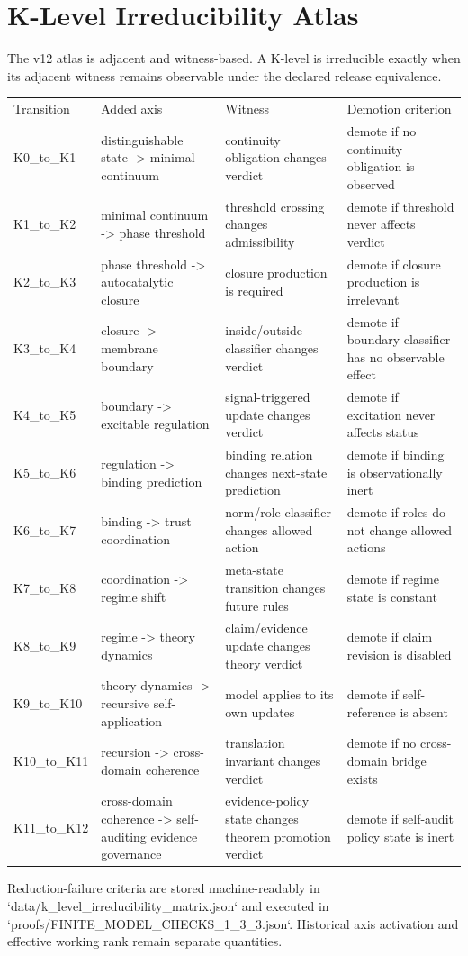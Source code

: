 \section{K-Level Irreducibility Atlas}
The v12 atlas is adjacent and witness-based. A K-level is irreducible exactly when its adjacent witness remains observable under the declared release equivalence.
\begin{tabular}{llll}
Transition & Added axis & Witness & Demotion criterion \\
K0_to_K1 & distinguishable state -> minimal continuum & continuity obligation changes verdict & demote if no continuity obligation is observed \\
K1_to_K2 & minimal continuum -> phase threshold & threshold crossing changes admissibility & demote if threshold never affects verdict \\
K2_to_K3 & phase threshold -> autocatalytic closure & closure production is required & demote if closure production is irrelevant \\
K3_to_K4 & closure -> membrane boundary & inside/outside classifier changes verdict & demote if boundary classifier has no observable effect \\
K4_to_K5 & boundary -> excitable regulation & signal-triggered update changes verdict & demote if excitation never affects status \\
K5_to_K6 & regulation -> binding prediction & binding relation changes next-state prediction & demote if binding is observationally inert \\
K6_to_K7 & binding -> trust coordination & norm/role classifier changes allowed action & demote if roles do not change allowed actions \\
K7_to_K8 & coordination -> regime shift & meta-state transition changes future rules & demote if regime state is constant \\
K8_to_K9 & regime -> theory dynamics & claim/evidence update changes theory verdict & demote if claim revision is disabled \\
K9_to_K10 & theory dynamics -> recursive self-application & model applies to its own updates & demote if self-reference is absent \\
K10_to_K11 & recursion -> cross-domain coherence & translation invariant changes verdict & demote if no cross-domain bridge exists \\
K11_to_K12 & cross-domain coherence -> self-auditing evidence governance & evidence-policy state changes theorem promotion verdict & demote if self-audit policy state is inert \\
\end{tabular}

Reduction-failure criteria are stored machine-readably in `data/k_level_irreducibility_matrix.json` and executed in `proofs/FINITE_MODEL_CHECKS_1_3_3.json`.
Historical axis activation and effective working rank remain separate quantities.
